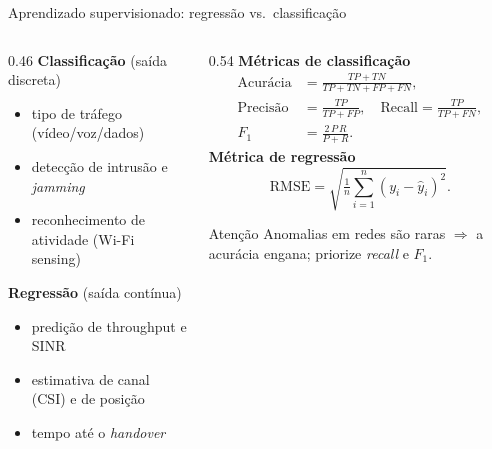 \documentclass[aspectratio=169,11pt]{beamer}
\begin{document}
\begin{frame}{Aprendizado supervisionado: regressão vs.\ classificação}
  \begin{columns}
    \begin{column}{0.46\textwidth}
      \textbf{Classificação} (saída discreta)
      \begin{itemize}
        \item tipo de tráfego (vídeo/voz/dados)
        \item detecção de intrusão e \emph{jamming}
        \item reconhecimento de atividade (Wi-Fi sensing)
      \end{itemize}
      \textbf{Regressão} (saída contínua)
      \begin{itemize}
        \item predição de throughput e SINR
        \item estimativa de canal (CSI) e de posição
        \item tempo até o \emph{handover}
      \end{itemize}
    \end{column}
    \begin{column}{0.54\textwidth}
      \textbf{Métricas de classificação}
      \small
      \begin{align*}
        \text{Acurácia} &= \frac{TP+TN}{TP+TN+FP+FN},\\[0.5mm]
        \text{Precisão} &= \frac{TP}{TP+FP},\quad \text{Recall} = \frac{TP}{TP+FN},\\[0.5mm]
        F_1 &= \frac{2\,P\,R}{P+R}.
      \end{align*}
      \textbf{Métrica de regressão}
      $$\text{RMSE} = \sqrt{\tfrac{1}{n}\textstyle\sum_{i=1}^{n}(y_i - \hat{y}_i)^2}.$$
      \begin{alertblock}{Atenção}
        Anomalias em redes são raras $\Rightarrow$ a acurácia engana; priorize \emph{recall} e $F_1$.
      \end{alertblock}
    \end{column}
  \end{columns}
\end{frame}
\end{document}

